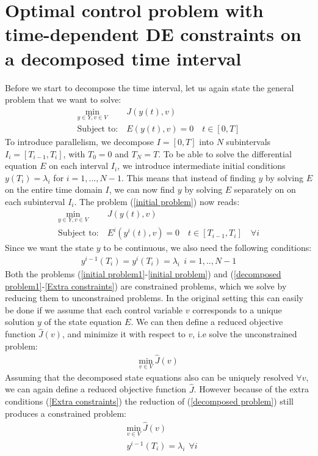 \section{Optimal control problem with time-dependent DE constraints on a decomposed time interval} \label{decomp_sec}
Before we start to decompose the time interval, let us again state the general problem that we want to solve:
\begin{align}
\underset{y\in Y,v\in V}{\text{min}} \ &J(y(t),v) \label{initial problem1}\\
\textrm{Subject to:} \ &E(y(t),v)=0  \quad t\in [0,T] \label{initial problem}
\end{align}
To introduce parallelism, we decompose $I=[0,T]$ into $N$ subintervals $I_i=[T_{i-1},T_i]$, with $T_0=0$ and $T_N=T$. To be able to solve the differential equation $E$ on each interval $I_i$, we introduce intermediate initial conditions $y(T_i)=\lambda_i$ for $i=1,...,N-1$. This means that instead of finding $y$ by solving $E$ on the entire time domain $I$, we can now find $y$ by solving $E$ separately on on each subinterval $I_i$. The problem (\ref{initial problem}) now reads:
\begin{align}
\underset{y\in Y,v\in V}{\text{min}} \ &J(y(t),v)  \label{decomposed problem1}\\
\textrm{Subject to:} \ &E^i(y^i(t),v)=0 \quad t\in [T_{i-1},T_i] \quad \forall i \label{decomposed problem}
\end{align} 
Since we want the state $y$ to be continuous, we also need the following conditions:
\begin{align}
y^{i-1}(T_i)=y^i(T_i)=\lambda_i \ \ i=1,..,N-1 \label{Extra constraints}
\end{align} 
Both the problems (\ref{initial problem1}-\ref{initial problem}) and (\ref{decomposed problem1}-\ref{Extra constraints}) are constrained problems, which we solve by reducing them to unconstrained problems. In the original setting this can easily be done if we assume that each control variable $v$ corresponds to a unique solution $y$ of the state equation $E$. We can then define a reduced objective function $\hat{J}(v)$, and minimize it with respect to $v$, i.e solve the unconstrained problem:
\begin{align*}
\underset{v\in V}{\text{min}} \ \hat J(v)
\end{align*} 
Assuming that the decomposed state equations also can be uniquely resolved $\forall v$, we can again define a reduced objective function  $\hat{J}$. However because of the extra conditions (\ref{Extra constraints}) the reduction of (\ref{decomposed problem}) still produces a constrained problem:
\begin{align}
&\underset{v\in V}{\text{min}} \ \hat J(v) \label{constrained reduced j}\\
&y^{i-1}(T_i)=\lambda_i \ \ \forall i \label{constrained reduced}
\end{align} 
